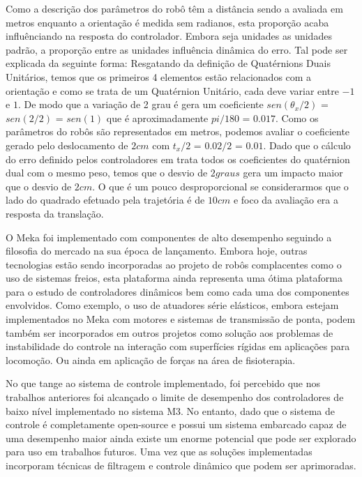 Como a descrição dos parâmetros do robô têm a distância sendo a avaliada em metros enquanto a orientação é medida sem radianos, esta proporção acaba influênciando na resposta do controlador. Embora seja unidades as unidades padrão, a proporção entre as unidades influência dinâmica do erro. Tal pode ser explicada da seguinte forma: Resgatando da definição de Quatérnions Duais Unitários, temos que os primeiros 4 elementos estão relacionados com a orientação e como se trata de um Quatérnion Unitário, cada deve variar entre $-1$ e $1$. De modo que a variação de 2 grau é gera um coeficiente $sen(\theta_x/2)$ =  $sen(2/2)$ = $sen(1)$ que é aproximadamente $pi/180$ = $0.017$. Como os parâmetros do robôs são representados em metros, podemos avaliar o coeficiente gerado pelo deslocamento de $2cm$ com $t_x/2$ = $0.02/2$ = $0.01$. Dado que o cálculo do erro definido pelos controladores em \cite{marcosps2016} trata todos os coeficientes do quatérnion dual com o mesmo peso, temos que o desvio de $2 graus$ gera um impacto maior que o desvio de $2cm$. O que é um pouco desproporcional se considerarmos que o lado do quadrado efetuado pela trajetória é de $10cm$ e foco da avaliação era a resposta da translação.

O Meka foi implementado com componentes de alto desempenho seguindo a filosofia do mercado na sua época de lançamento. Embora hoje, outras tecnologias estão sendo incorporadas ao projeto de robôs complacentes como o uso de sistemas freios, esta plataforma ainda representa uma ótima plataforma para o estudo de controladores dinâmicos bem como cada uma dos componentes envolvidos. Como exemplo, o uso de atuadores série elásticos, embora estejam implementados no Meka com motores e sistemas de transmissão de ponta, podem também ser incorporados em outros projetos como solução aos problemas de instabilidade do controle na interação com superfícies rígidas em aplicações para locomoção. Ou ainda em aplicação de forças na área de fisioterapia.

No que tange ao sistema de controle implementado, foi percebido que nos trabalhos anteriores foi alcançado o limite de desempenho dos controladores de baixo nível implementado no sistema M3. No entanto, dado que o sistema de controle é completamente open-source e possui um sistema embarcado capaz de uma desempenho maior ainda existe um enorme potencial que pode ser explorado para uso em trabalhos futuros. Uma vez que as soluções implementadas incorporam técnicas de filtragem e controle dinâmico que podem ser aprimoradas.

